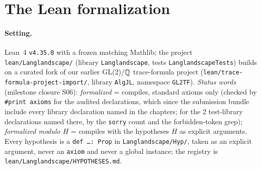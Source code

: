 \section{The Lean formalization}\label{sec:lean}

\paragraph{Setting.} Lean~4 \texttt{v4.35.0} with a frozen matching Mathlib; the project \texttt{lean/Langlandscape/}
(library \texttt{Langlandscape}, tests \texttt{LanglandscapeTests}) builds on a curated fork of our earlier GL(2)/$\mathbb{Q}$
trace-formula project (\texttt{lean/trace-formula-project-import/}, library \texttt{AlgJL}, namespace \texttt{GL2TF}).
\emph{Status words} (milestone closure S06): \emph{formalized} = compiles, standard axioms only (checked by \texttt{\#print axioms} for the \GateAudited{} audited
declarations, which since the submission bundle include every library declaration named in the chapters; for the 2 test-library declarations named there, by the \texttt{sorry} count and the forbidden-token grep); \emph{formalized modulo
$H$} = compiles with the hypotheses $H$ as explicit arguments. Every hypothesis is a \texttt{def \dots : Prop} in
\texttt{Langlandscape/Hyp/}, taken as an explicit argument, never an \texttt{axiom} and never a global instance; the registry
is \texttt{lean/Langlandscape/HYPOTHESES.md}.

